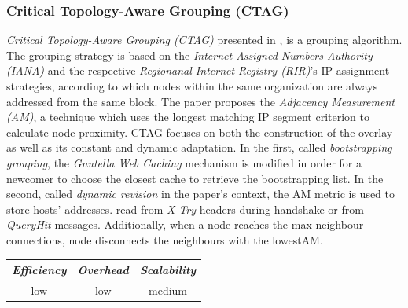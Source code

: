 \subsubsection{Critical Topology-Aware Grouping (CTAG)}
\emph{Critical Topology-Aware Grouping (CTAG)} presented in
\cite{ZL2006}, is a grouping algorithm. The grouping strategy is
based
on the \emph{Internet Assigned Numbers Authority (IANA)} and the respective
\emph{Regionanal Internet Registry (RIR)}'s IP assignment strategies, according
to which nodes within the same organization are always addressed from the same
block. The paper proposes the \emph{Adjacency Measurement (AM)}, a technique
which uses the longest matching IP segment criterion to calculate node
proximity. CTAG focuses on both the construction of the overlay as well as its
constant and dynamic adaptation. In the first, called \emph{bootstrapping
grouping}, the \emph{Gnutella Web Caching} mechanism is modified in order for a
newcomer to choose the closest cache to retrieve the bootstrapping list. In the
second, called \emph{dynamic revision} in the paper's context, the AM metric is
used to store hosts' addresses. read from \emph{X-Try} headers during handshake
or from \emph{QueryHit} messages. Additionally, when a node reaches the max
neighbour connections, node disconnects the neighbours with the lowestAM.

\begin{center}
\begin{tabular}{ccc}
\emph{Efficiency} & \emph{Overhead} & \emph{Scalability} \\
\hline
low &
low &
medium
\end{tabular}
\end{center}



